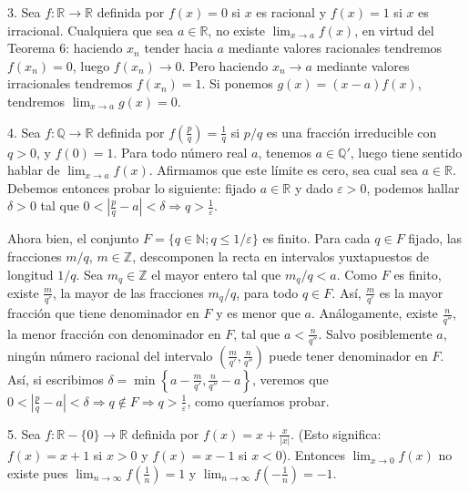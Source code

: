 \documentclass[12pt,oneside]{book}
\begin{document}
3. Sea \( f: \mathbb{R} \to \mathbb{R} \) definida por \( f(x) = 0 \) si \( x \) es racional y \( f(x) = 1 \) si \( x \) es irracional. Cualquiera que sea \( a \in \mathbb{R} \), no existe \(\lim_{x \to a} f(x)\), en virtud del Teorema 6: haciendo \( x_n \) tender hacia \( a \) mediante valores racionales tendremos \( f(x_n) = 0 \), luego \( f(x_n) \to 0 \). Pero haciendo \( x_n \to a \) mediante valores irracionales tendremos \( f(x_n) = 1 \). Si ponemos \( g(x) = (x - a)f(x) \), tendremos \(\lim_{x \to a} g(x) = 0\).

4. Sea \( f: \mathbb{Q} \to \mathbb{R} \) definida por \( f\left(\frac{p}{q}\right) = \frac{1}{q} \) si \( p/q \) es una fracción irreducible con \( q > 0 \), y \( f(0) = 1 \). Para todo número real \( a \), tenemos \( a \in \mathbb{Q}' \), luego tiene sentido hablar de \( \lim_{x \to a} f(x) \). Afirmamos que este límite es cero, sea cual sea \( a \in \mathbb{R} \). Debemos entonces probar lo siguiente: fijado \( a \in \mathbb{R} \) y dado \( \varepsilon > 0 \), podemos hallar \( \delta > 0 \) tal que \( 0 < \left|\frac{p}{q} - a\right| < \delta \Rightarrow q > \frac{1}{\varepsilon} \).

Ahora bien, el conjunto \( F = \{q \in \mathbb{N}; q \leq 1/\varepsilon\} \) es finito. Para cada \( q \in F \) fijado, las fracciones \( m/q \), \( m \in \mathbb{Z} \), descomponen la recta en intervalos yuxtapuestos de longitud \( 1/q \). Sea \( m_q \in \mathbb{Z} \) el mayor entero tal que \( m_q/q < a \). Como \( F \) es finito, existe \( \frac{m}{q'} \), la mayor de las fracciones \( m_q/q \), para todo \( q \in F \). Así, \( \frac{m}{q'} \) es la mayor fracción que tiene denominador en \( F \) y es menor que \( a \). Análogamente, existe \( \frac{n}{q''} \), la menor fracción con denominador en \( F \), tal que \( a < \frac{n}{q''} \). Salvo posiblemente \( a \), ningún número racional del intervalo \( \left(\frac{m}{q'}, \frac{n}{q''}\right) \) puede tener denominador en \( F \). Así, si escribimos \( \delta = \min \left\{a - \frac{m}{q'}, \frac{n}{q''} - a\right\} \), veremos que \( 0 < \left|\frac{p}{q} - a\right| < \delta \Rightarrow q \notin F \Rightarrow q > \frac{1}{\varepsilon} \), como queríamos probar.

5. Sea \( f: \mathbb{R} - \{0\} \to \mathbb{R} \) definida por \( f(x) = x + \frac{x}{|x|} \). (Esto significa: \( f(x) = x + 1 \) si \( x > 0 \) y \( f(x) = x - 1 \) si \( x < 0 \)). Entonces \( \lim_{x \to 0} f(x) \) no existe pues \( \lim_{n \to \infty} f\left(\frac{1}{n}\right) = 1 \) y \( \lim_{n \to \infty} f\left(-\frac{1}{n}\right) = -1 \).
\end{document}
